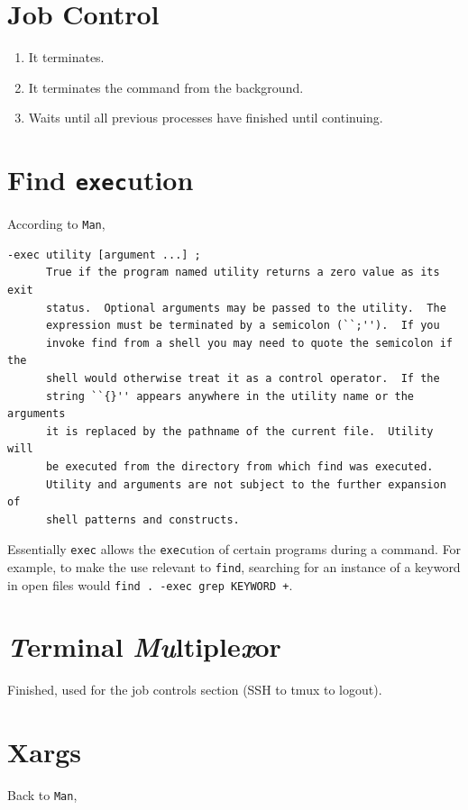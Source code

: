 \documentclass{article}
\newcommand{\shellcmd}[1]{\texttt{\colorbox{gray!30}{#1}}}
\begin{document}
\section{Job Control}
\begin{enumerate}
    \item It terminates.
    \item It terminates the command from the background.
    \item Waits until all previous processes have finished until continuing.
\end{enumerate}

\section{Find \shellcmd{exec}ution}
According to \shellcmd{Man},

\begin{verbatim}
-exec utility [argument ...] ;
      True if the program named utility returns a zero value as its exit
      status.  Optional arguments may be passed to the utility.  The
      expression must be terminated by a semicolon (``;'').  If you
      invoke find from a shell you may need to quote the semicolon if the
      shell would otherwise treat it as a control operator.  If the
      string ``{}'' appears anywhere in the utility name or the arguments
      it is replaced by the pathname of the current file.  Utility will
      be executed from the directory from which find was executed.
      Utility and arguments are not subject to the further expansion of
      shell patterns and constructs.
\end{verbatim}

Essentially \shellcmd{exec} allows the \shellcmd{exec}ution of certain programs during a command. For example, to make the use relevant to \shellcmd{find}, searching for an instance of a keyword in open files would \shellcmd{find . -exec grep KEYWORD {} +}.


\section{\textit{T}erminal \textit{Mu}ltiple\textit{x}or}
Finished, used for the job controls section (SSH to tmux to logout).

\section{Xargs}
Back to \shellcmd{Man},
\end{document}
